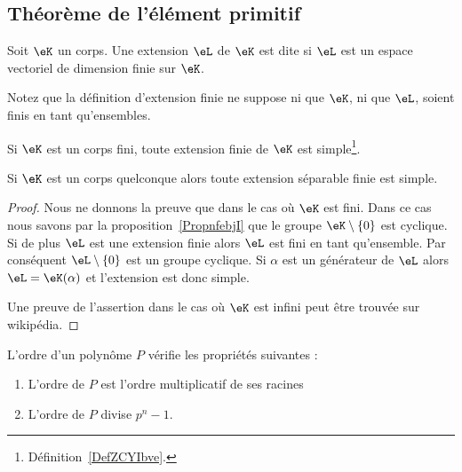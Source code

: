 \subsection{Théorème de l'élément primitif}

\begin{definition}
	Soit \( \eK\) un corps. Une extension \( \eL\) de \( \eK\) est dite  si \( \eL\) est un espace vectoriel de dimension finie sur \( \eK\).
\end{definition}
Notez que la définition d'extension finie ne suppose ni que \( \eK\), ni que \( \eL\), soient finis en tant qu'ensembles.

\begin{theorem}
	\begin{description}
	\item
		Si \( \eK\) est un corps fini, toute extension finie de \( \eK\) est simple\footnote{Définition~\ref{DefZCYIbve}.}.
	\item
		Si \( \eK\) est un corps quelconque alors toute extension séparable finie est simple.
	\end{description}
\end{theorem}

\begin{proof}
	Nous ne donnons la preuve que dans le cas où \( \eK\) est fini. Dans ce cas nous savons par la proposition~\ref{PropnfebjI} que le groupe \( \eK\setminus\{ 0 \}\) est cyclique. Si de plus \( \eL\) est une extension finie alors \( \eL\) est fini en tant qu'ensemble. Par conséquent \( \eL\setminus\{ 0 \}\) est un groupe cyclique. Si \( \alpha\) est un générateur de \( \eL\) alors \( \eL=\eK(\alpha)\) et l'extension est donc simple.

	Une preuve de l'assertion dans le cas où \( \eK\) est infini peut être trouvée sur wikipédia.
\end{proof}

\begin{proposition}
	L'ordre d'un polynôme \( P\) vérifie les propriétés suivantes :
	\begin{enumerate}
		\item
		      L'ordre de \( P\) est l'ordre multiplicatif de ses racines
		\item
		      L'ordre de \( P\) divise \( p^n-1\).
	\end{enumerate}
\end{proposition}

